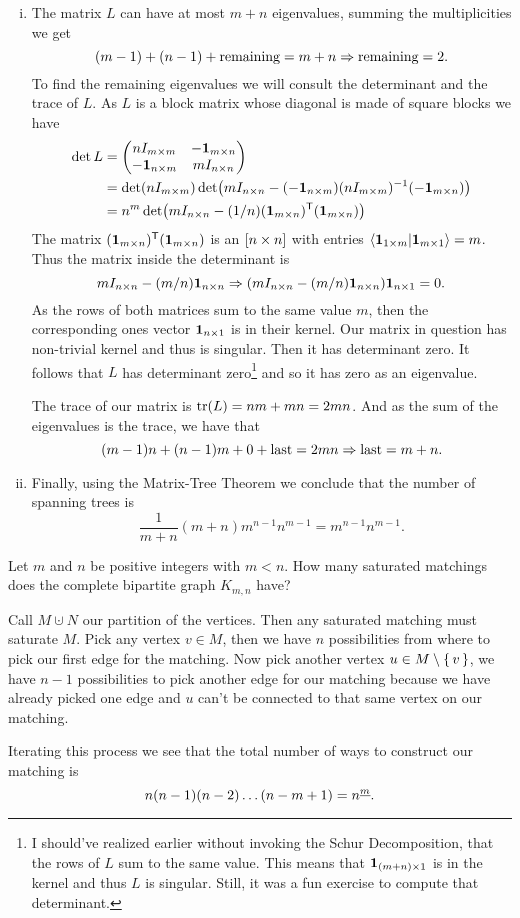 \documentclass[12pt]{memoir}
\begin{document}
\begin{ptcbr}
\begin{enumerate}[i)]
        \item The matrix $L$ can have at most $m+n$ eigenvalues, summing the multiplicities we get 
        $$(m-1)+(n-1)+\text{remaining}=m+n\Rightarrow \text{remaining}=2.$$
        To find the remaining eigenvalues we will consult the determinant and the trace of $L$. As $L$ is a block matrix whose diagonal is made of square blocks we have 
        \begin{align*}
            \det L&=\begin{pmatrix} nI_{m\times m} & -\mathbf{1}_{m\times n} \\ -\mathbf{1}_{n\times m} & mI_{n\times n} \end{pmatrix}\\
            &=\det(nI_{m\times m})\det(mI_{n\times n}-(-\mathbf{1}_{n\times m})(nI_{m\times m})^{-1}(-\mathbf{1}_{m\times n}))\\
            &=n^m\det(mI_{n\times n}-(1/n)(\mathbf{1}_{m\times n})^{\mathsf{T}}(\mathbf{1}_{m\times n}))
        \end{align*}
        The matrix $(\mathbf{1}_{m\times n})^{\mathsf{T}}(\mathbf{1}_{m\times n})$ is an $[n\times n]$ with entries $\braket{\mathbf{1}_{1\times m}}{\mathbf{1}_{m\times 1}}=m$. Thus the matrix inside the determinant is 
        $$mI_{n\times n}-(m/n)\mathbf{1}_{n\times n}\Rightarrow (mI_{n\times n}-(m/n)\mathbf{1}_{n\times n})\mathbf{1}_{n\times 1}=0.$$
        As the rows of both matrices sum to the same value $m$, then the corresponding ones vector $\mathbf{1}_{n\times 1}$ is in their kernel. Our matrix in question has non-trivial kernel and thus is singular. Then it has determinant zero. It follows that $L$ has determinant zero\footnote{I should've realized earlier without invoking the Schur Decomposition, that the rows of $L$ sum to the same value. This means that $\mathbf{1}_{(m+n)\times 1}$ is in the kernel and thus $L$ is singular. Still, it was a fun exercise to compute that determinant.} and so it has zero as an eigenvalue.\par 
        The trace of our matrix is $\tr(L)=nm+mn=2mn$. And as the sum of the eigenvalues is the trace, we have that 
        $$(m-1)n+(n-1)m+0+\text{last}=2mn\Rightarrow\text{last}=m+n.$$
        \item Finally, using the Matrix-Tree Theorem we conclude that the number of spanning trees is 
        $$\frac{1}{m+n}(m+n)m^{n-1}n^{m-1}=m^{n-1}n^{m-1}.$$
    \end{enumerate}
\end{ptcbr}

\begin{Ej}[Exercise 4]
    Let $m$ and $n$ be positive integers with $m < n$. How many saturated matchings does the complete bipartite graph $K_{m,n}$ have?
\end{Ej}

\begin{ptcbr}
Call $M\cupdot N$ our partition of the vertices. Then any saturated matching must saturate $M$. Pick any vertex $v\in M$, then we have $n$ possibilities from where to pick our first edge for the matching. Now pick another vertex $u\in M\setminus\{\,v\,\}$, we have $n-1$ possibilities to pick another edge for our matching because we have already picked one edge and $u$ can't be connected to that same vertex on our matching.\par
Iterating this process we see that the total number of ways to construct our matching is 
$$n(n-1)(n-2)\dots(n-m+1)=n^{\underline{m}}.$$
\end{ptcbr}
\end{document}
